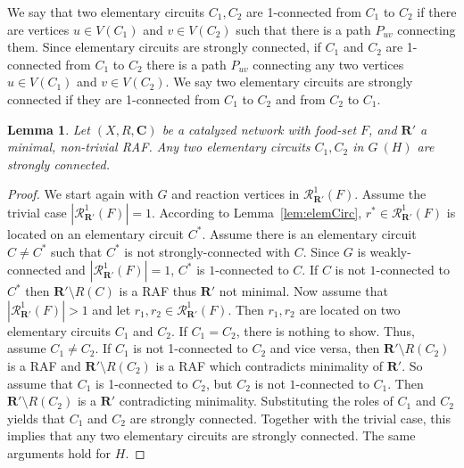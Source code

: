\documentclass[pdflatex]{sn-jnl}
\theoremstyle{thmstyleone}%
\newtheorem{lemma}[theorem]{Lemma}%
\theoremstyle{examplesty}%
\theoremstyle{thmstylethree}%
\newcommand{\RAF}[0]{\mathbf{R}'}
\newcommand{\POR}[0]{\mathscr{R}}
\newcommand{\cat}{\mathbf{C}}
\begin{document}
We say that two elementary circuits $C_1, C_2$ are 1-connected from $C_1$ to $C_2$ if there are vertices $u\in V(C_1)$ 
and $v\in V(C_2)$ such that there is a path $P_{uv}$ connecting them. Since elementary circuits are strongly connected, 
if $C_1$ and $C_2$ are 1-connected from $C_1$ to $C_2$ there is a path $P_{uv}$ connecting any two vertices $u\in V(C_1)$ 
and $v\in V(C_2)$. We say two elementary circuits are strongly connected if they are 1-connected from $C_1$ to $C_2$ and 
from $C_2$ to $C_1$.
\vspace{6pt}
\begin{lemma}\label{lem:strElCirc}
	Let $(X,R, \cat)$ be a catalyzed network with food-set $F$, and $\RAF$ a minimal, non-trivial RAF. Any two elementary circuits $C_1,C_2$ 
	in $G \ (H)$ are strongly connected. 
\end{lemma}
	\begin{proof}
		We start again with $G$ and reaction vertices in $\POR^1_{\RAF}(F)$. Assume the trivial case $|\POR^1_{\RAF}(F)|=1$. According to 
		Lemma~\ref{lem:elemCirc}, $r^*\in \POR^1_{\RAF}(F)$ is located on an elementary circuit $C^*$. Assume there is an elementary
		circuit $C\neq C^*$ such that $C^*$ is not strongly-connected with $C$. Since $G$ is weakly-connected and $|\POR^1_{\RAF}(F)|=1$, 
		$C^*$ is $1$-connected to $C$. If $C$ is not $1$-connected to $C^*$ then $\RAF\setminus R(C)$ is a RAF thus $\RAF$ not minimal. 
		Now assume that $|\POR^1_{\RAF}(F)|>1$ and let $r_1,r_2\in \POR^1_{\RAF}(F)$. Then $r_1,r_2$ are located on two elementary circuits
		$C_1$ and $C_2$. If $C_1=C_2$, there is nothing to show. Thus, assume $C_1\neq C_2$. If $C_1$ is not 1-connected to $C_2$ and 
		vice versa, then $\RAF\setminus R(C_2)$ is a RAF and $\RAF\setminus R(C_2)$ is a RAF which contradicts minimality of $\RAF$. So 
		assume that $C_1$ is 1-connected to $C_2$, but $C_2$ is not $1$-connected to $C_1$. Then $\RAF\setminus R(C_2)$ is a $\RAF$ 
		contradicting minimality. Substituting the roles of $C_1$ and $C_2$ yields that $C_1$ and $C_2$ are strongly connected. Together
		with the trivial case, this implies that any two elementary circuits are strongly connected. The same arguments hold for $H$.
	\end{proof}
\vspace{6pt}
\end{document}
